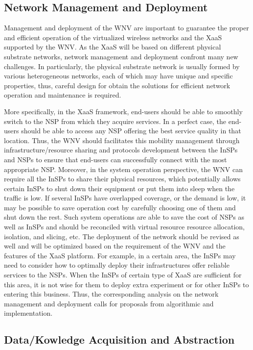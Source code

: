 \documentclass[12pt,draftclsnofoot,onecolumn]{IEEEtran}
\begin{document}
\subsection{Network Management and Deployment}
Management and deployment of the WNV are important to guarantee
the proper and efficient operation of the virtualized wireless
networks and the XaaS supported by the WNV. As the XaaS will be
based on different physical substrate networks, network management
and deployment confront many new challenges. In particularly, the
physical substrate network is usually formed by various
heterogeneous networks, each of which may have unique and specific
properties, thus, careful design for obtain the solutions for
efficient network operation and maintenance is required.\par

More specifically, in the XaaS framework, end-users should be able
to smoothly switch to the NSP from which they acquire services. In
a perfect case, the end-users should be able to access any NSP
offering the best service quality in that location. Thus, the WNV
should facilitates this mobility management through
infrastructure/resource sharing and protocols development between
the InSPs and NSPs to ensure that end-users can successfully
connect with the most appropriate NSP. Moreover, in the system
operation perspective, the WNV can require all the InSPs to share
their physical resources, which potentially allows certain InSPs
to shut down their equipment or put them into sleep when the
traffic is low. If several InSPs have overlapped coverage, or the
demand is low, it may be possible to save operation cost by
carefully choosing one of them and shut down the rest. Such system
operations are able to save the cost of NSPs as well as InSPs and
should be reconciled with virtual resource resource allocation,
isolation, and slicing, etc. The deployment of the network should
be revised as well and will be optimized based on the requirement
of the WNV and the features of the XaaS platform. For example, in
a certain area, the InSPs may need to consider how to optimally
deploy their infrastructures offer reliable services to the NSPs.
When the InSPs of certain type of XaaS are sufficient for this
area, it is not wise for them to deploy extra experiment or for
other InSPs to entering this business. Thus, the corresponding
analysis on the network management and deployment calls for
proposals from algorithmic and implementation.


\subsection{Data/Kowledge Acquisition and Abstraction}
\end{document}

